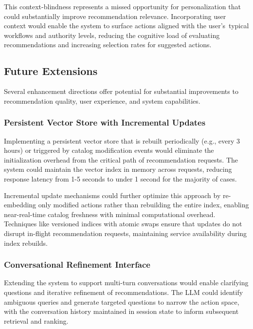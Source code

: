 This context-blindness represents a missed opportunity for personalization that could substantially improve recommendation relevance. Incorporating user context would enable the system to surface actions aligned with the user's~typical workflows and authority levels, reducing the cognitive load of evaluating recommendations and increasing selection rates for suggested actions.

\subsection{Future Extensions}

Several enhancement directions offer potential for substantial improvements to recommendation quality, user experience, and system capabilities.

\subsubsection{Persistent Vector Store with Incremental Updates}

Implementing a persistent vector store that is rebuilt periodically (e.g., every 3 hours) or triggered by catalog modification events would eliminate the initialization overhead from the critical path of recommendation requests. The system could maintain the vector index in memory across requests, reducing response latency from 1-5 seconds to under 1 second for the majority of cases.

Incremental update mechanisms could further optimize this approach by re-embedding only modified actions rather than rebuilding the entire index, enabling near-real-time catalog freshness with minimal computational overhead. Techniques like versioned indices with atomic swaps ensure that updates do not disrupt in-flight recommendation requests, maintaining service availability during index rebuilds.

\subsubsection{Conversational Refinement Interface}

Extending the system to support multi-turn conversations would enable clarifying questions and iterative refinement of recommendations. The LLM could identify ambiguous queries and generate targeted questions to narrow the action space, with the conversation history maintained in session state to inform subsequent retrieval and ranking.

